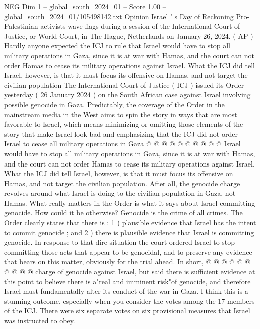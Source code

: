 \begin{textsample}{NEG Dim 1 – global\_south\_2024\_01 – Score 1.00 – global\_south\_2024\_01/105498142.txt}  \label{ex:f1_neg_351}
Opinion Israel ' s Day of Reckoning Pro-Palestinian activists wave flags during a session of the International Court of Justice, or World Court, in The Hague, Netherlands on January 26, 2024. ( AP ) Hardly anyone expected the ICJ to rule that Israel would have to stop all military operations in Gaza, since it is at war with Hamas, and the court can not order Hamas to cease its military operations against Israel.
What the ICJ did tell Israel, however, is that it must focus its offensive on Hamas, and not target the civilian population The International Court of Justice ( ICJ ) issued its Order yesterday ( 26 January 2024 ) on the South African case against Israel involving possible genocide in Gaza.
Predictably, the coverage of the Order in the mainstream media in the West aims to spin the story in ways that are most favorable to Israel, which means minimizing or omitting those elements of the story that make Israel look bad and emphasizing that the ICJ did not order Israel to cease all military operations in Gaza @ @ @ @ @ @ @ @ @ @ Israel would have to stop all military operations in Gaza, since it is at war with Hamas, and the court can not order Hamas to cease its military operations against Israel.
What the ICJ did tell Israel, however, is that it must focus its offensive on Hamas, and not target the civilian population.
After all, the genocide charge revolves around what Israel is doing to the civilian population in Gaza, not Hamas.
What really matters in the Order is what it says about Israel committing genocide.
How could it be otherwise?
Genocide is the crime of all crimes.
The Order clearly states that there is : 1 ) plausible evidence that Israel has the intent to commit genocide ; and 2 ) there is plausible evidence that Israel is committing genocide.
In response to that dire situation the court ordered Israel to stop committing those acts that appear to be genocidal, and to preserve any evidence that bears on this matter, obviously for the trial ahead.
In short, @ @ @ @ @ @ @ @ @ @ charge of genocide against Israel, but said there is sufficient evidence at this point to believe there is a"real and imminent risk"of genocide, and therefore Israel must fundamentally alter its conduct of the war in Gaza.
I think this is a stunning outcome, especially when you consider the votes among the 17 members of the ICJ.
There were six separate votes on six provisional measures that Israel was instructed to obey.

\end{textsample}
